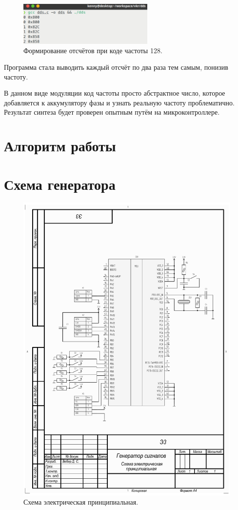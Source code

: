 \begin{figure}[H]
    \centering
    \includegraphics[width=0.6\textwidth]{../image/dds128.png}
    \caption{Формирование отсчётов при коде частоты 128.}
\end{figure}

	Программа стала выводить каждый отсчёт по два раза тем самым, понизив частоту.
	
	В данном виде модуляции код частоты просто абстрактное число, которое добавляется к аккумулятору фазы и узнать реальную частоту проблематично. Результат синтеза будет проверен опытным путём на микроконтроллере.

\section{Алгоритм работы}


\section{Схема генератора}
\begin{figure}[h]
    \centering
    \includegraphics[width=1.0\textwidth]{../image/scheme-cropped.pdf}
    \caption{Схема электрическая принципиальная.}
\end{figure}

